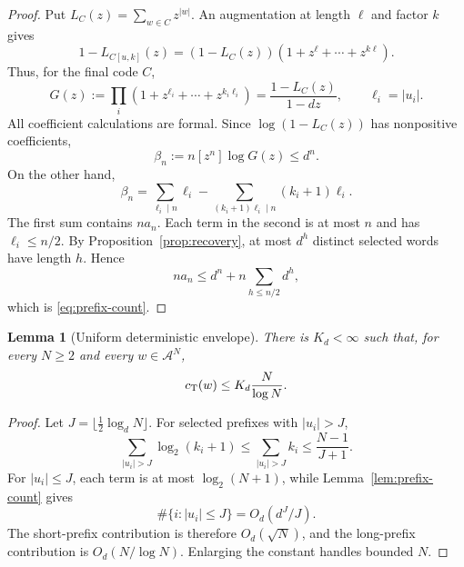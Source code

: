 \documentclass[journal]{IEEEtran}
\theoremstyle{plain}
\newtheorem{lemma}[theorem]{Lemma}
\theoremstyle{definition}
\theoremstyle{remark}
\newcommand{\A}{\mathcal A}
\newcommand{\cT}{c_{\rm T}}
\begin{document}
\begin{proof}
Put $L_C(z)=\sum_{w\in C}z^{|w|}$.  An augmentation at length $\ell$ and factor $k$ gives
\begin{equation*}
 1-L_{C[u,k]}(z)=(1-L_C(z))(1+z^\ell+\cdots+z^{k\ell}).
\end{equation*}
Thus, for the final code $C$,
\begin{equation*}
 G(z):=\prod_i(1+z^{\ell_i}+\cdots+z^{k_i\ell_i})
 =\frac{1-L_C(z)}{1-dz},
 \qquad \ell_i=|u_i|.
\end{equation*}
All coefficient calculations are formal.  Since $\log(1-L_C(z))$ has nonpositive coefficients,
\begin{equation*}
 \beta_n:=n[z^n]\log G(z)\le d^n.
\end{equation*}
On the other hand,
\begin{equation*}
 \beta_n=\sum_{\ell_i\mid n}\ell_i
 -\sum_{(k_i+1)\ell_i\mid n}(k_i+1)\ell_i.
\end{equation*}
The first sum contains $na_n$.  Each term in the second is at most $n$ and has $\ell_i\le n/2$.  By Proposition~\ref{prop:recovery}, at most $d^h$ distinct selected words have length $h$.  Hence
\begin{equation*}
 na_n\le d^n+n\sum_{h\le n/2}d^h,
\end{equation*}
which is \eqref{eq:prefix-count}.
\end{proof}

\begin{lemma}[Uniform deterministic envelope]\label{lem:global-envelope}
There is $K_d<\infty$ such that, for every $N\ge2$ and every $w\in\A^N$,
\begin{equation}\label{eq:global-envelope}
 \cT(w)\le K_d\frac{N}{\log N}.
\end{equation}
\end{lemma}

\begin{proof}
Let $J=\lfloor\tfrac12\log_dN\rfloor$.  For selected prefixes with $|u_i|>J$,
\begin{equation*}
 \sum_{|u_i|>J}\log_2(k_i+1)
 \le\sum_{|u_i|>J}k_i
 \le\frac{N-1}{J+1}.
\end{equation*}
For $|u_i|\le J$, each term is at most $\log_2(N+1)$, while Lemma~\ref{lem:prefix-count} gives
\begin{equation*}
 \#\{i:|u_i|\le J\}=O_d(d^J/J).
\end{equation*}
The short-prefix contribution is therefore $O_d(\sqrt N)$, and the long-prefix contribution is $O_d(N/\log N)$.  Enlarging the constant handles bounded $N$.
\end{proof}
\end{document}
